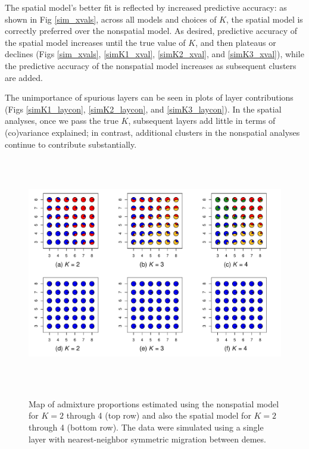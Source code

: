 \documentclass[10pt,letterpaper]{article}
\begin{document}
The spatial model's better fit is reflected by increased predictive accuracy:
as shown in Fig \ref{sim_xvals},
across all models and choices of $K$, the spatial model is correctly preferred over the nonspatial model.
As desired, predictive accuracy of the spatial model increases until the true value of $K$,
and then plateaus or declines
(Figs \ref{sim_xvals}, \ref{simK1_xval}, \ref{simK2_xval}, and \ref{simK3_xval}),
while the predictive accuracy of the nonspatial model increases as subsequent clusters are added.


The unimportance of spurious layers can be seen in plots of layer contributions
(Figs \ref{simK1_laycon}, \ref{simK2_laycon}, and \ref{simK3_laycon}).
In the spatial analyses, once we pass the true $K$, 
subsequent layers add little in terms of (co)variance explained; 
in contrast, additional clusters in the nonspatial analyses continue to contribute substantially.

\begin{figure}
	\centering
		{\includegraphics[width=6in,height=4in]{figs/sims/Fig2_simK1_sp_vs_nsp.pdf}}
	\caption{
	Map of admixture proportions estimated using the nonspatial model for $K=2$ through 4 (top row)
	and also the spatial model for $K=2$ through 4 (bottom row).
	The data were simulated using a single layer with nearest-neighbor symmetric migration between demes.
    }\label{simK1_pies}
\end{figure}
\end{document}
